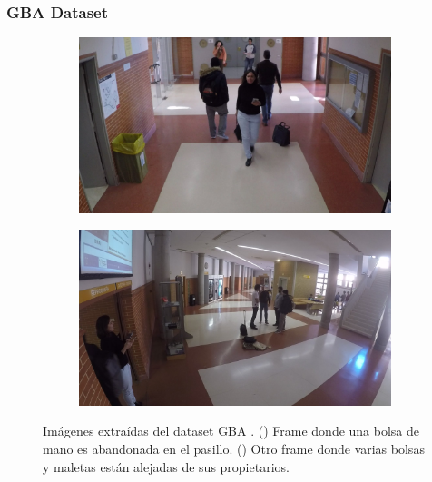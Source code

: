 \subsubsection{GBA Dataset}

\begin{figure}[ht!]
  \centering
  \begin{subfigure}[b]{0.45\textwidth}
    \includegraphics[width=\textwidth]{img/chapters/resultados/bases-datos/GBA_1.jpg}
    \caption{}
    \label{fig:GBA_1}
  \end{subfigure}
  \qquad\qquad
  \begin{subfigure}[b]{0.45\textwidth}
    \includegraphics[width=\textwidth]{img/chapters/resultados/bases-datos/GBA_2.jpg}
    \caption{}
    \label{fig:GBA_2}
  \end{subfigure}
  \caption{Imágenes extraídas del dataset GBA \cite{gba-dataset}.
    (\protect{}) Frame donde una bolsa de mano es abandonada en el pasillo.
    (\protect{}) Otro frame donde varias bolsas y maletas están alejadas de sus propietarios.}
  \label{fig:GBA}
\end{figure}

